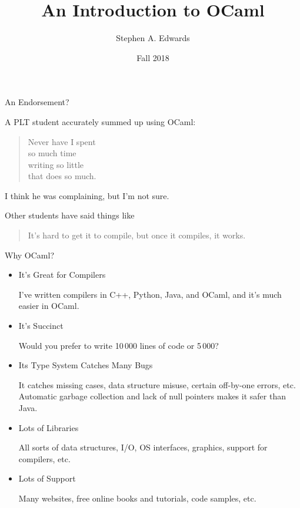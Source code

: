 \documentclass{plt}
\title{An Introduction to OCaml}
\author{Stephen A. Edwards}
\institute{Columbia University}
\date{Fall 2018}
\begin{document}
\frame{\titlepage}

\frame{\tableofcontents}

\begin{frame}{An Endorsement?}

A PLT student accurately summed up using OCaml:

\begin{quote}
Never have I spent \\ so much time \\ writing so little \\ that does so much.
\end{quote}

I think he was complaining, but I'm not sure.

Other students have said things like

\begin{quote}
It's hard to get it to compile, but once it compiles, it works.
\end{quote}

\end{frame}

\begin{frame}{Why OCaml?}

  \begin{itemize}
  \item \alert{It's Great for Compilers}

    I've written compilers in C++, Python, Java, and OCaml, and it's much
    easier in OCaml.

  \item \alert{It's Succinct}

    Would you prefer to write 10\,000 lines of code or 5\,000?
    
  \item \alert{Its Type System Catches Many Bugs}

    It catches missing cases, data structure misuse, certain off-by-one
    errors, etc.  Automatic garbage collection and lack of null pointers
    makes it safer than Java.
    
  \item \alert{Lots of Libraries}
  
    All sorts of data structures, I/O, OS interfaces, graphics, support for
    compilers, etc.

  \item \alert{ Lots of Support}
    
    Many websites, free online books and tutorials, code samples, etc.

\end{itemize}
\end{frame}
\end{document}

